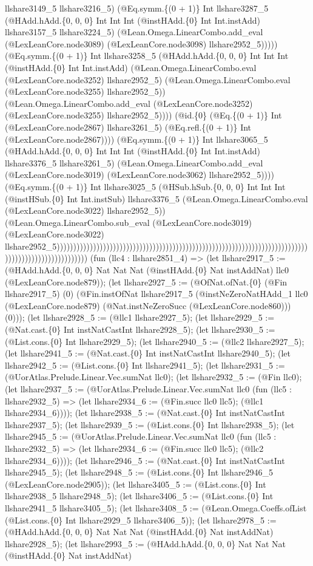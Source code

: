 \documentclass[11pt]{article}
\begin{document}
llshare3149\_5 llshare3216\_5) (@Eq.symm.\{(0 + 1)\} Int llshare3287\_5 (@HAdd.hAdd.\{0, 0, 0\} Int Int Int (@instHAdd.\{0\} Int Int.instAdd) llshare3157\_5 llshare3224\_5) (@Lean.Omega.LinearCombo.add\_eval (@LexLeanCore.node3089) (@LexLeanCore.node3098) llshare2952\_5))))) (@Eq.symm.\{(0 + 1)\} Int llshare3258\_5 (@HAdd.hAdd.\{0, 0, 0\} Int Int Int (@instHAdd.\{0\} Int Int.instAdd) (@Lean.Omega.LinearCombo.eval (@LexLeanCore.node3252) llshare2952\_5) (@Lean.Omega.LinearCombo.eval (@LexLeanCore.node3255) llshare2952\_5)) (@Lean.Omega.LinearCombo.add\_eval (@LexLeanCore.node3252) (@LexLeanCore.node3255) llshare2952\_5)))) (@id.\{0\} (@Eq.\{(0 + 1)\} Int (@LexLeanCore.node2867) llshare3261\_5) (@Eq.refl.\{(0 + 1)\} Int (@LexLeanCore.node2867)))) (@Eq.symm.\{(0 + 1)\} Int llshare3065\_5 (@HAdd.hAdd.\{0, 0, 0\} Int Int Int (@instHAdd.\{0\} Int Int.instAdd) llshare3376\_5 llshare3261\_5) (@Lean.Omega.LinearCombo.add\_eval (@LexLeanCore.node3019) (@LexLeanCore.node3062) llshare2952\_5)))) (@Eq.symm.\{(0 + 1)\} Int llshare3025\_5 (@HSub.hSub.\{0, 0, 0\} Int Int Int (@instHSub.\{0\} Int Int.instSub) llshare3376\_5 (@Lean.Omega.LinearCombo.eval (@LexLeanCore.node3022) llshare2952\_5)) (@Lean.Omega.LinearCombo.sub\_eval (@LexLeanCore.node3019) (@LexLeanCore.node3022) llshare2952\_5))))))))))))))))))))))))))))))))))))))))))))))))))))))))))))))))))))))))))))))))))))))))))))))))))))) (fun (llc4 : llshare2851\_4) => (let llshare2917\_5 := (@HAdd.hAdd.\{0, 0, 0\} Nat Nat Nat (@instHAdd.\{0\} Nat instAddNat) llc0 (@LexLeanCore.node879)); (let llshare2927\_5 := (@OfNat.ofNat.\{0\} (@Fin llshare2917\_5) (0) (@Fin.instOfNat llshare2917\_5 (@instNeZeroNatHAdd\_1 llc0 (@LexLeanCore.node879) (@Nat.instNeZeroSucc (@LexLeanCore.node860))) (0))); (let llshare2928\_5 := (@llc1 llshare2927\_5); (let llshare2929\_5 := (@Nat.cast.\{0\} Int instNatCastInt llshare2928\_5); (let llshare2930\_5 := (@List.cons.\{0\} Int llshare2929\_5); (let llshare2940\_5 := (@llc2 llshare2927\_5); (let llshare2941\_5 := (@Nat.cast.\{0\} Int instNatCastInt llshare2940\_5); (let llshare2942\_5 := (@List.cons.\{0\} Int llshare2941\_5); (let llshare2931\_5 := (@UorAtlas.Prelude.Linear.Vec.sumNat llc0); (let llshare2932\_5 := (@Fin llc0); (let llshare2937\_5 := (@UorAtlas.Prelude.Linear.Vec.sumNat llc0 (fun (llc5 : llshare2932\_5) => (let llshare2934\_6 := (@Fin.succ llc0 llc5); (@llc1 llshare2934\_6)))); (let llshare2938\_5 := (@Nat.cast.\{0\} Int instNatCastInt llshare2937\_5); (let llshare2939\_5 := (@List.cons.\{0\} Int llshare2938\_5); (let llshare2945\_5 := (@UorAtlas.Prelude.Linear.Vec.sumNat llc0 (fun (llc5 : llshare2932\_5) => (let llshare2934\_6 := (@Fin.succ llc0 llc5); (@llc2 llshare2934\_6)))); (let llshare2946\_5 := (@Nat.cast.\{0\} Int instNatCastInt llshare2945\_5); (let llshare2948\_5 := (@List.cons.\{0\} Int llshare2946\_5 (@LexLeanCore.node2905)); (let llshare3405\_5 := (@List.cons.\{0\} Int llshare2938\_5 llshare2948\_5); (let llshare3406\_5 := (@List.cons.\{0\} Int llshare2941\_5 llshare3405\_5); (let llshare3408\_5 := (@Lean.Omega.Coeffs.ofList (@List.cons.\{0\} Int llshare2929\_5 llshare3406\_5)); (let llshare2978\_5 := (@HAdd.hAdd.\{0, 0, 0\} Nat Nat Nat (@instHAdd.\{0\} Nat instAddNat) llshare2928\_5); (let llshare2993\_5 := (@HAdd.hAdd.\{0, 0, 0\} Nat Nat Nat (@instHAdd.\{0\} Nat instAddNat) 
\end{document}
